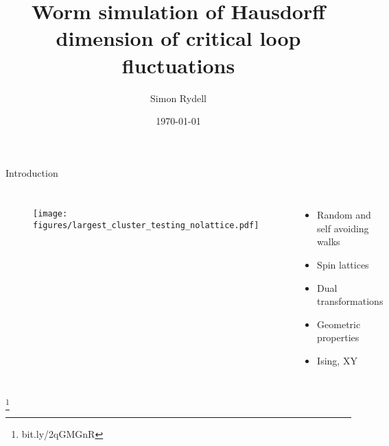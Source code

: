 \documentclass[10pt]{beamer}
\title{Worm simulation of Hausdorff dimension of critical loop fluctuations}
\date{\today}
\date{}
\author{Simon Rydell}
\institute{Royal Institute of Technology, Stockholm}
\newcommand\blfootnote[1]{%
  \begingroup
  \renewcommand\thefootnote{}\footnote{#1}%
  \addtocounter{footnote}{-1}%
  \endgroup
}
\begin{document}
\begin{frame}
\titlepage
\end{frame}


\begin{frame}{Introduction}
    \begin{columns}[c]
        \column{3in}
        \begin{figure}[h!]
            \centering
            \texttt{[image: figures/largest\_cluster\_testing\_nolattice.pdf]}
        \end{figure}
        \column{1.5in}
        \begin{itemize}
            \item Random and self avoiding walks
            \item Spin lattices
            \item Dual transformations
            \item Geometric properties
            \item Ising, XY
        \end{itemize}
    \end{columns}
    \blfootnote{bit.ly/2qGMGnR}
\end{frame}
\end{document}
